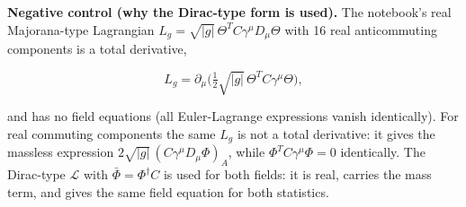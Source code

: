 \documentclass[11pt]{article}
\begin{document}
\textbf{Negative control (why the Dirac-type form is used).} The notebook's real Majorana-type Lagrangian $L_g = \sqrt{|g|}\,\Theta^TC\gamma^\mu D_\mu\Theta$ with 16 real anticommuting components is a total derivative,

\[
L_g = \partial_\mu\big(\tfrac12\sqrt{|g|}\,\Theta^TC\gamma^\mu\Theta\big),
\]

and has no field equations (all Euler-Lagrange expressions vanish identically). For real commuting components the same $L_g$ is not a total derivative: it gives the massless expression $2\sqrt{|g|}\,(C\gamma^\mu D_\mu\Phi)_A$, while $\Phi^TC\gamma^\mu\Phi = 0$ identically. The Dirac-type $\mathcal{L}$ with $\bar\Phi = \Phi^\dagger C$ is used for both fields: it is real, carries the mass term, and gives the same field equation for both statistics.
\end{document}
